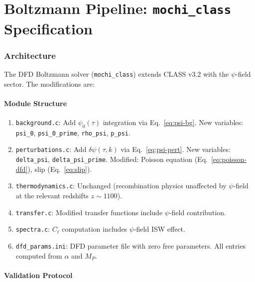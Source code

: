 \documentclass[11pt,a4paper]{article}
\theoremstyle{remark}
\begin{document}
\newpage
\part{Boltzmann Pipeline: \texttt{mochi\_class} Specification}
\label{part:boltzmann}

\section{Architecture}

The DFD Boltzmann solver (\texttt{mochi\_class}) extends CLASS v3.2 with
the $\psi$-field sector. The modifications are:

\subsection{Module Structure}

\begin{enumerate}
\item \texttt{background.c}: Add $\psi_0(\tau)$ integration via Eq.~\eqref{eq:psi-bg}.
  New variables: \texttt{psi\_0}, \texttt{psi\_0\_prime}, \texttt{rho\_psi}, \texttt{p\_psi}.

\item \texttt{perturbations.c}: Add $\delta\psi(\tau, k)$ via Eq.~\eqref{eq:psi-pert}.
  New variables: \texttt{delta\_psi}, \texttt{delta\_psi\_prime}.
  Modified: Poisson equation (Eq.~\ref{eq:poisson-dfd}), slip (Eq.~\ref{eq:slip}).

\item \texttt{thermodynamics.c}: Unchanged (recombination physics unaffected
  by $\psi$-field at the relevant redshifts $z \sim 1100$).

\item \texttt{transfer.c}: Modified transfer functions include $\psi$-field contribution.

\item \texttt{spectra.c}: $C_\ell$ computation includes $\psi$-field ISW effect.

\item \texttt{dfd\_params.ini}: DFD parameter file with zero free parameters.
  All entries computed from $\alpha$ and $M_P$.
\end{enumerate}

\subsection{Validation Protocol}
\end{document}
